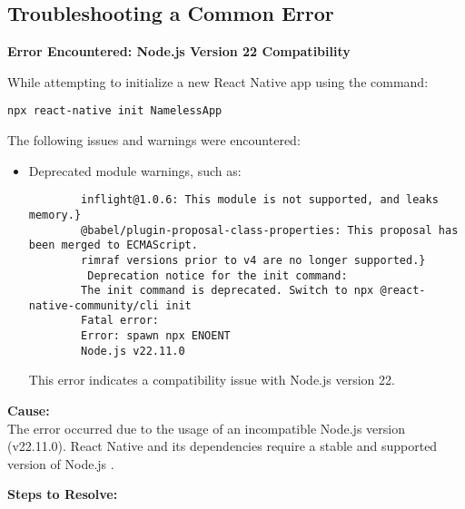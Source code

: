 \documentclass{article}
\begin{document}
\subsection{Troubleshooting a Common Error}

\textbf{Error Encountered: Node.js Version 22 Compatibility}

While attempting to initialize a new React Native app using the command:

\begin{lstlisting}
npx react-native init NamelessApp
\end{lstlisting}

The following issues and warnings were encountered:

\begin{itemize}
    \item Deprecated module warnings, such as:
    \begin{lstlisting}
        inflight@1.0.6: This module is not supported, and leaks memory.}
        @babel/plugin-proposal-class-properties: This proposal has been merged to ECMAScript.
        rimraf versions prior to v4 are no longer supported.}
         Deprecation notice for the init command:
        The init command is deprecated. Switch to npx @react-native-community/cli init
        Fatal error:
        Error: spawn npx ENOENT
        Node.js v22.11.0
    \end{lstlisting}
    This error indicates a compatibility issue with Node.js version 22.
\end{itemize}

\textbf{Cause:} \\
The error occurred due to the usage of an incompatible Node.js version (v22.11.0). React Native and its dependencies require a stable and supported version of Node.js .

\textbf{Steps to Resolve:}
\end{document}
